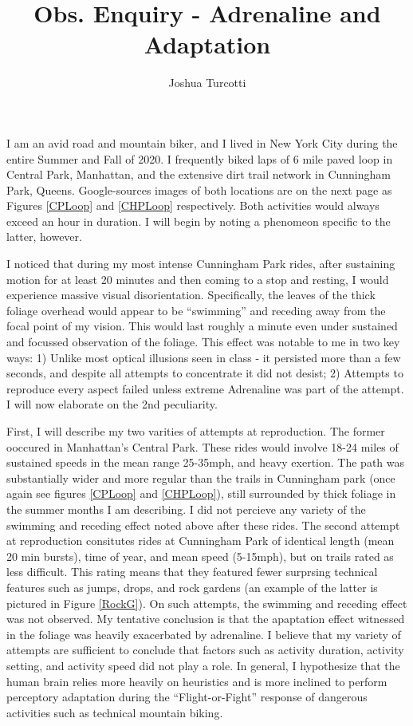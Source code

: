 \documentclass{article}
\title{Obs. Enquiry - Adrenaline and Adaptation}
\author{Joshua Turcotti}
\begin{document}
\maketitle

I am an avid road and mountain biker, and I lived in New York City during the entire Summer and Fall of 2020. I frequently biked laps of 6 mile paved loop in Central Park, Manhattan, and the extensive dirt trail network in Cunningham Park, Queens. Google-sources images of both locations are on the next page as Figures \ref{CPLoop} and \ref{CHPLoop} respectively. Both activities would always exceed an hour in duration. I will begin by noting a phenomeon specific to the latter, however.

I noticed that during my most intense Cunningham Park rides, after sustaining motion for at least 20 minutes and then coming to a stop and resting, I would experience massive visual disorientation. Specifically, the leaves of the thick foliage overhead would appear to be ``swimming'' and receding away from the focal point of my vision. This would last roughly a minute even under sustained and focussed observation of the foliage. This effect was notable to me in two key ways: 1) Unlike most optical illusions seen in class - it persisted more than a few seconds, and despite all attempts to concentrate it did not desist; 2) Attempts to reproduce every aspect failed unless extreme Adrenaline was part of the attempt. I will now elaborate on the 2nd peculiarity.

First, I will describe my two varities of attempts at reproduction. The former ooccured in Manhattan's Central Park. These rides would involve 18-24 miles of sustained speeds in the mean range 25-35mph, and heavy exertion. The path was substantially wider and more regular than the trails in Cunningham park (once again see figures \ref{CPLoop} and \ref{CHPLoop}), still surrounded by thick foliage in the summer months I am describing. I did not percieve any variety of the swimming and receding effect noted above after these rides. The second attempt at reproduction consitutes rides at Cunningham Park of identical length (mean 20 min bursts), time of year, and mean speed (5-15mph), but on trails rated as less difficult. This rating means that they featured fewer surprsing technical features such as jumps, drops, and rock gardens (an example of the latter is pictured in Figure \ref{RockG}). On such attempts, the swimming and receding effect was not observed. My tentative conclusion is that the apaptation effect witnessed in the foliage was heavily exacerbated by adrenaline. I believe that my variety of attempts are sufficient to conclude that factors such as activity duration, activity setting, and activity speed did not play a role. In general, I hypothesize that the human brain relies more heavily on heuristics and is more inclined to perform perceptory adaptation during the ``Flight-or-Fight'' response of dangerous activities such as technical mountain biking. 
\end{document}

